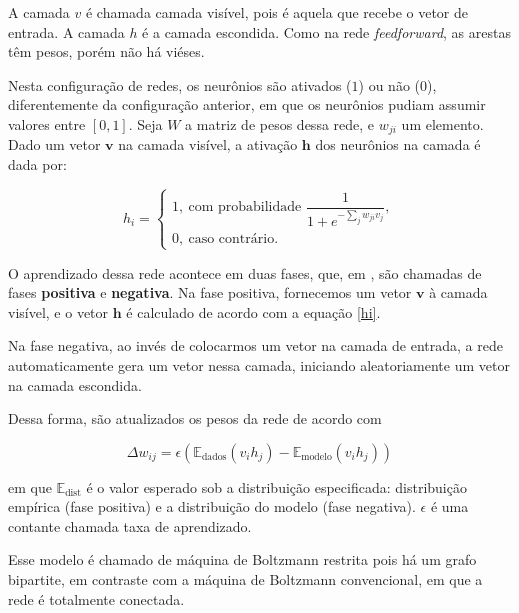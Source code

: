 \documentclass{article}
\begin{document}
            A camada $v$ é chamada camada visível, pois é aquela que recebe o vetor de entrada.
            A camada $h$ é a camada escondida. Como na rede \textit{feedforward}, as arestas têm pesos, porém não há viéses.

            Nesta configuração de redes, os neurônios são ativados ($1$) ou não ($0$), diferentemente da configuração anterior, em que os neurônios pudiam assumir valores entre $[0, 1]$.
            Seja $W$ a matriz de pesos dessa rede, e $w_{ji}$ um elemento.
            Dado um vetor $\mathbf{v}$ na camada visível, a ativação $\mathbf{h}$ dos neurônios na camada é dada por:

            \begin{equation}
                h_i =   \begin{cases}
                            1, \ \textrm{com probabilidade } \dfrac{1}{1 + e^{-\sum_j w_{ji} v_j}},\\
                            0, \ \textrm{caso contrário}.
                        \end{cases}
                \label{hi}
            \end{equation}

            O aprendizado dessa rede acontece em duas fases, que, em \cite{testolin2018deep}, são chamadas de fases \textbf{positiva} e \textbf{negativa}.
            Na fase positiva, fornecemos um vetor $\mathbf{v}$ à camada visível, e o vetor $\mathbf{h}$ é calculado de acordo com a equação \ref{hi}.

            Na fase negativa, ao invés de colocarmos um vetor na camada de entrada, a rede automaticamente gera um vetor nessa camada, iniciando aleatoriamente um vetor na camada escondida.

            Dessa forma, são atualizados os pesos da rede de acordo com

            \begin{equation}
                \Delta w_{ij} = \epsilon(\mathbb{E}_{\textrm{dados}}(v_i h_j) - \mathbb{E}_{\textrm{modelo}}(v_i h_j))
            \end{equation}

            em que $\mathbb{E}_{\textrm{dist}}$ é o valor esperado sob a distribuição especificada: distribuição empírica (fase positiva) e a distribuição do modelo (fase negativa).
            $\epsilon$ é uma contante chamada taxa de aprendizado.
            
            Esse modelo é chamado de máquina de Boltzmann restrita pois há um grafo bipartite, em contraste com a máquina de Boltzmann convencional, em que a rede é totalmente conectada.
\end{document}
